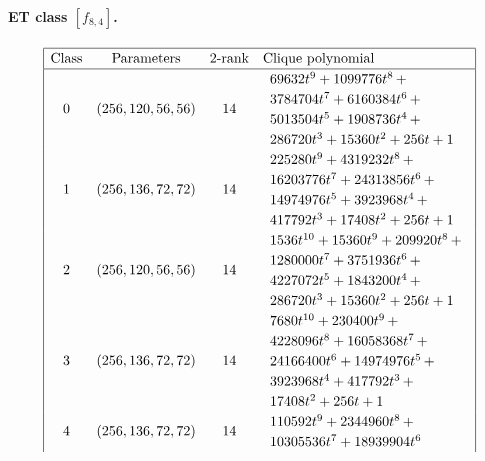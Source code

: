 \documentclass[12pt,a4paper]{article}
\begin{document}
\paragraph*{ET class $[f_{8,4}]$.}
%
\begin{table}[!bhpt] %
\small{}
\begin{align*}
\def\arraystretch{1.2}
\begin{array}{|cccl|}
\hline
\text{Class} &
\text{Parameters} &
\text{2-rank} &
\text{Clique polynomial}
\\
\hline
0 &
(256, 120, 56, 56) &
14 &
\begin{array}{l}
69632t^{9} + 1099776t^{8}
\,+
\\
 3784704t^{7} + 6160384t^{6}
\,+
\\
 5013504t^{5} + 1908736t^{4}
\,+
\\
 286720t^{3} + 15360t^{2} + 256t + 1
\end{array}
\\
1 &
(256, 136, 72, 72) &
14 &
\begin{array}{l}
225280t^{9} + 4319232t^{8}
\,+
\\
 16203776t^{7} + 24313856t^{6}
\,+
\\
 14974976t^{5} + 3923968t^{4}
\,+
\\
 417792t^{3} + 17408t^{2} + 256t + 1
\end{array}
\\
2 &
(256, 120, 56, 56) &
14 &
\begin{array}{l}
1536t^{10} + 15360t^{9} + 209920t^{8}
\,+
\\
 1280000t^{7} + 3751936t^{6}
\,+
\\
 4227072t^{5} + 1843200t^{4}
\,+
\\
 286720t^{3} + 15360t^{2} + 256t + 1
\end{array}
\\
3 &
(256, 136, 72, 72) &
14 &
\begin{array}{l}
7680t^{10} + 230400t^{9}
\,+
\\
 4228096t^{8} + 16058368t^{7}
\,+
\\
 24166400t^{6} + 14974976t^{5}
\,+
\\
 3923968t^{4} + 417792t^{3}
\,+
\\
 17408t^{2} + 256t + 1
\end{array}
\\
4 &
(256, 136, 72, 72) &
14 &
\begin{array}{l}
110592t^{9} + 2344960t^{8}
\,+
\\
 10305536t^{7} + 18939904t^{6}

\end{array}
\end{array}
\end{align*}
\end{table}
\end{document}
